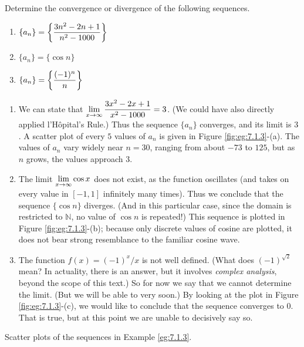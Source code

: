 \begin{example} \label{eg:7.1.3} %
Determine the convergence or divergence of the following sequences.

\begin{enumerate}[1)]
\item $\displaystyle\{a_n\} = \left\{\frac{3n^2-2n+1}{n^2-1000}\right\}$
\item $\{a_n\} = \{\cos n \}$
\item  $\displaystyle\{a_n\} = \left\{\frac{(-1)^n}{n}\right\}$
\end{enumerate}

\solution
\begin{enumerate}[1)]
\item We can state that $\displaystyle\lim_{x\to\infty} \frac{3x^2-2x+1}{x^2-1000} = 3$. (We could have also directly applied l'H\^opital's Rule.) Thus the sequence $\{a_n\}$ converges, and its limit is $3$. A scatter plot of every $5$ values of $a_n$ is given in Figure \ref{fig:eg:7.1.3}-(a). The values of $a_n$ vary widely near $n=30$, ranging from about $-73$ to $125$, but as $n$ grows, the values approach $3$.

\item The limit $\displaystyle\lim_{x\to\infty}\cos x$ does not exist, as the function oscillates (and takes on every value in $[-1,1]$ infinitely many times). Thus we conclude that the sequence $\{\cos n\}$ diverges. (And in this particular case, since the domain is restricted to $\mathbb{N}$, no value of $\cos n$ is repeated!) This sequence is plotted in Figure \ref{fig:eg:7.1.3}-(b); because only discrete values of cosine are plotted, it does not bear strong resemblance to the familiar cosine wave.

\item The function $f(x) = (-1)^x/x$ is not well defined. (What does $(-1)^{\sqrt{2}}$ mean? In actuality, there is an answer, but it involves \emph{complex analysis}, beyond the scope of this text.) So for now we say that we cannot determine the limit. (But we will be able to very soon.) By looking at the plot in Figure \ref{fig:eg:7.1.3}-(c), we would like to conclude that the sequence converges to $0$. That is true, but at this point we are unable to decisively say so.
\end{enumerate}
\end{example}

\begin{marginfigure}[-4CM] %


\caption{Scatter plots of the sequences in Example \ref{eg:7.1.3}.}\label{fig:eg:7.1.3}
\end{marginfigure}